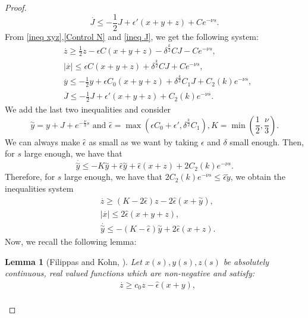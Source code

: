 \documentclass[11pt,a4paper]{article}
\newcommand{\1}{\mathbbm{1}}
\numberwithin{equation}{section}
\newtheorem{lemma}{Lemma}[section]
\theoremstyle{remark}
\begin{document}
\begin{proof}
\begin{equation}\label{ineq J}
\overset{.}{J}\leq -\frac{1}{2}J+\epsilon ' (x+y+z)+Ce^{-\nu s}.
\end{equation}
From \eqref{ineq xyz},\eqref{Control N} and \eqref{ineq J}, we get the following system:
\begin{equation}
\begin{split}
&\overset{.}{z}\geq \frac{1}{2}z-\epsilon C (x+y+z)-\delta^{\frac{k}{2}} CJ-Ce^{-\nu s},\\
&|\overset{.}{x}|\leq \epsilon C (x+y+z)+\delta^{\frac{k}{2}} CJ+Ce^{-\nu s},\\
&\overset{.}{y}\leq -\frac{1}{2}y+\epsilon C_0 (x+y+z)+\delta^{\frac{k}{2}} C_1J+C_2(k)e^{-\nu s},\\
&\overset{.}{J}\leq -\frac{1}{2} J+\epsilon ' (x+y+z)+C_2(k)e^{-\nu s}.
\end{split}
\end{equation}
We add the last two inequalities and consider 
$$\overset{\sim}{y}=y+J+e^{-\frac{\nu}{3} s}\text{ and }\widehat{\epsilon}=\max(\epsilon C_0+\epsilon ', \delta^{\frac{k}{2}}C_1), K=\min\left(\frac{1}{2},\frac{\nu}{3}\right).$$
We can always make $\widehat{\epsilon}$ as small as we want by taking $\epsilon$ and $\delta$ small enough. Then, for $s$ large enough, we have that
$$\overset{.}{\overset{\sim}{y}}\leq -K\overset{\sim}{y}+\widehat\epsilon{\overset{\sim}{y}}+\widehat{\epsilon}(x+z)+2C_2(k)e^{-\nu s}.$$
Therefore, for $s$ large enough, we have that  $2C_2(k)e^{-\nu s}\leq \widehat \epsilon\tilde{y}$, we obtain the inequalities system 
\begin{equation}\label{system x,y,z}
\begin{split}
&\overset{.}{z}\geq \left(K-2\widehat{\epsilon}\right)z-2\widehat{\epsilon}(x+\overset{\sim}{y}),\\
&|\overset{.}{x}|\leq 2\widehat{\epsilon}(x+y+z),\\
&\overset{.}{\overset{\sim}{y}}\leq -\left(K-\widehat\epsilon\right)\overset{\sim}{y}+2\widehat{\epsilon}(x+z).
\end{split}
\end{equation}
Now, we recall the following lemma:
\begin{lemma}[Filippas and Kohn, \cite{FK1992}]\label{lemma x,y,z}
Let $x(s ) ,y (s ) , z ( s )$ be absolutely continuous, real valued functions which are non-negative and satisfy:
\begin{equation}
\begin{split}
&\overset{.}{z}\geq c_0z-\widehat\epsilon(x+y),\\

\end{split}
\end{equation}
\end{lemma}
\end{proof}
\end{document}
